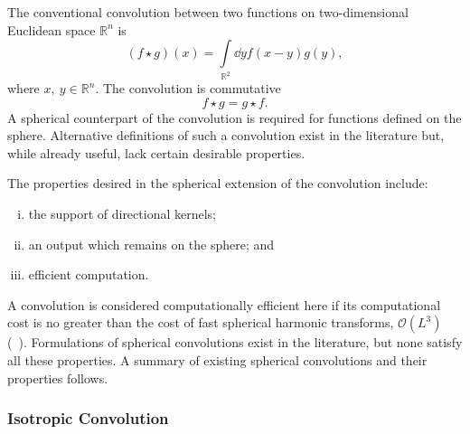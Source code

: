 The conventional convolution between two functions on two-dimensional Euclidean space \(\mathbb{R}^{n}\) is
%
\begin{equation}
	(f \star g)(x)
	= \int\limits_{\mathbb{R}^{2}} \dd{y} f(x-y) g(y),
\end{equation}
%
where \(x,\ y \in \mathbb{R}^{n}\).
The convolution is commutative
%
\begin{equation}
	f \star g
	= g \star f.
\end{equation}
%
A spherical counterpart of the convolution is required for functions defined on the sphere.
Alternative definitions of such a convolution exist in the literature but, while already useful, lack certain desirable properties.

The properties desired in the spherical extension of the convolution include:
%
\begin{enumerate}[(i),nosep]
	\item the support of directional kernels;
	\item an output which remains on the sphere; and
	\item efficient computation.
\end{enumerate}
%
A convolution is considered computationally efficient here if its computational cost is no greater than the cost of fast spherical harmonic transforms, \ie{} \(\mathcal{O}(L^{3})\) (\eg{}~\autocite{Driscoll1994,McEwen2011}).
Formulations of spherical convolutions exist in the literature, but none satisfy all these properties.
A summary of existing spherical convolutions and their properties follows.

\subsubsection{Isotropic Convolution}


